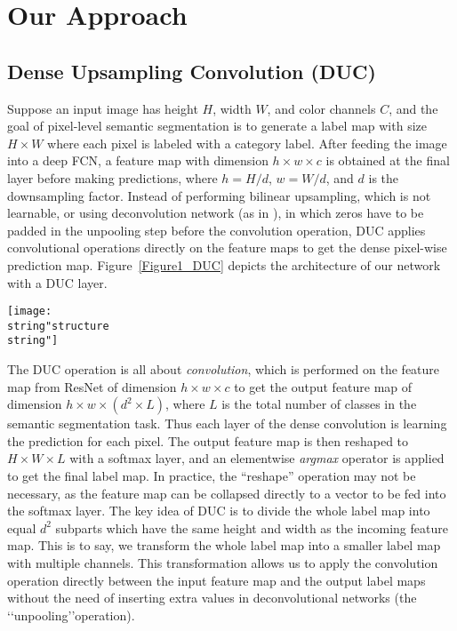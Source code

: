 \documentclass[10pt,twocolumn,letterpaper]{article}
\begin{document}
\section{Our Approach}
\subsection{Dense Upsampling Convolution (DUC)}
Suppose an input image has height $H$, width $W$, and color channels $C$, and the goal of pixel-level semantic segmentation is to generate a label map with size $H\times{W}$ where each pixel is labeled with a category label. After feeding the image into a deep FCN, a feature map with dimension $h\times{w}\times{c}$ is obtained at the final layer before making predictions, where $h=H/d$, $w=W/d$, and $d$ is the downsampling factor. Instead of performing bilinear upsampling, which is not learnable, or using deconvolution network (as in \cite{noh2015learning}), in which zeros have to be padded in the unpooling step before the convolution operation, DUC applies convolutional operations directly on the feature maps to get the dense pixel-wise prediction map. Figure~\ref{Figure1_DUC} depicts the architecture of our network with a DUC layer.

\begin{figure*}[t]
\begin{center}
\texttt{[image: \\string"structure\\string"]}
\end{center}
\caption{Illustration of the architecture of ResNet-101 network with Hybrid Dilated Convolution (HDC) and Dense Upsampling Convolution (DUC) layer. HDC is applied within ResNet blocks, and DUC is applied on top of network and is used for decoding purpose.}
\label{Figure1_DUC}
\vspace{-1pt}
\end{figure*}

The DUC operation is all about \textit{convolution}, which is performed on the feature map from ResNet of dimension $h\times{w}\times{c}$ to get the output feature map of dimension $h\times{w}\times{(d^2\times{L})}$, where $L$ is the total number of classes in the semantic segmentation task. Thus each layer of the dense convolution is learning the prediction for each pixel. The output feature map is then reshaped to $H\times{W}\times{L}$ with a softmax layer, and an elementwise \textit{argmax} operator is applied to get the final label map. In practice, the ``reshape'' operation may not be necessary, as the feature map can be collapsed directly to a vector to be fed into the softmax layer. The key idea of DUC is to divide the whole label map into equal $d^2$ subparts which have the same height and width as the incoming feature map. This is to say, we transform the whole label map into a smaller label map with multiple channels. This transformation allows us to apply the convolution operation directly between the input feature map and the output label maps without the need of inserting extra values in deconvolutional networks (the \lq\lq unpooling\rq\rq operation).
\end{document}
